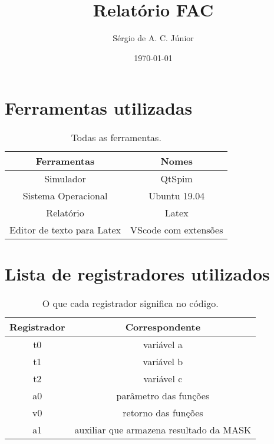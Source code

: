 \documentclass[a4paper, 12 pt]{article}
\begin{document}
    \title{\Large{\textbf{Relatório FAC}}}
    \author{Sérgio de A. C. Júnior}
    \date{\today}

    \maketitle
    \tableofcontents

    \newpage
    \section{Ferramentas utilizadas}

    \begin{table}[!htb]
        \centering
        \begin{tabular}{|c|c|}
            \hline
            Ferramentas                & Nomes \\ \hline \hline
            Simulador                  & QtSpim \\ \hline
            Sistema Operacional        & Ubuntu 19.04 \\ \hline
            Relatório                  & Latex \\ \hline
            Editor de texto para Latex & VScode com extensões \\ \hline
        \end{tabular}
        \caption{Todas as ferramentas.}
    \end{table}

    \section{Lista de registradores utilizados}

    \begin{table}[!htb]
        \centering
        \begin{tabular}{|c|c|}
            \hline
            Registrador & Correspondente \\ \hline \hline
            t0          & variável a \\ \hline
            t1          & variável b \\ \hline
            t2          & variável c \\ \hline
            a0          & parâmetro das funções \\ \hline
            v0          & retorno das funções \\ \hline
            a1          & auxiliar que armazena resultado da MASK \\ \hline
        \end{tabular}
        \caption{O que cada registrador significa no código.}
    \end{table}
\end{document}

